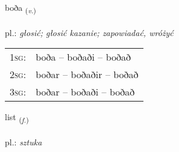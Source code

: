 \documentclass[frontgrid, backgrid]{flacards}\usepackage[]{graphicx}\usepackage[]{xcolor}
\begin{document}
\renewcommand{\flhead}{\vskip5pt \fboxsep=0pt {\small\bfseries\footnotesize Sagnorð | Verb}}
\renewcommand{\fcfoot}{\vskip5pt \fboxsep=0pt \hspace{2pt}{\small\bfseries\footnotesize 2K}}

\renewcommand{\blhead}{\vskip5pt {\small\bfseries\footnotesize Sagnorð | Verb }}
\renewcommand{\bcfoot}{\vskip5pt \hspace{2pt}{\small\bfseries\footnotesize 2K}}


{boða \small{\textsubscript{(\textit{v.})}} \\[1ex] %
\textphonetic{[pɔːða]} \\
pl.: \emph{głosić; głosić kazanie; zapowiadać, wróżyć} \\  [2ex]
\renewcommand*{\arraystretch}{0.8}
\begin{tabular}{p{1cm}l}
\textsc{1sg}: & boða -- boðaði -- boðað \\ 
\textsc{2sg}: & boðar -- boðaðir -- boðað \\ 
\textsc{3sg}: & boðar -- boðaði -- boðað \\ 
\end{tabular}
}

\renewcommand{\flhead}{\vskip5pt \fboxsep=0pt {\small\bfseries\footnotesize Nafnorð | Noun}}
\renewcommand{\fcfoot}{\vskip5pt \fboxsep=0pt \hspace{2pt}{\small\bfseries\footnotesize 2K}}

\renewcommand{\blhead}{\vskip5pt {\small\bfseries\footnotesize Nafnorð | Noun }}
\renewcommand{\bcfoot}{\vskip5pt \hspace{2pt}{\small\bfseries\footnotesize 2K}}


{list \small{\textsubscript{(\textit{f.})}} \\[1ex] %
\textphonetic{[lɪst]} \\
pl.: \emph{sztuka} \\  [2ex]
\renewcommand*{\arraystretch}{0.8}
}
\end{document}
